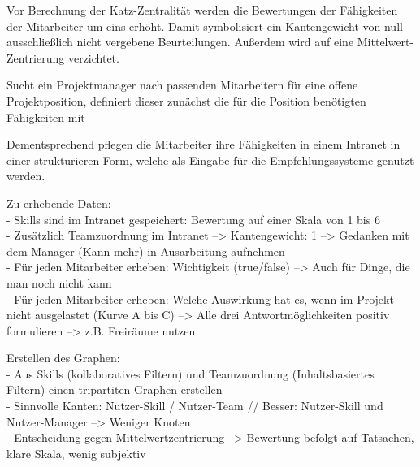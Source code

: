 Vor Berechnung der Katz-Zentralität werden die Bewertungen der Fähigkeiten der Mitarbeiter um eins erhöht. Damit symbolisiert ein Kantengewicht von null ausschließlich nicht vergebene Beurteilungen. Außerdem wird auf eine Mittelwert-Zentrierung verzichtet. 

\newpage
Sucht ein Projektmanager nach passenden Mitarbeitern für eine offene Projektposition, definiert dieser zunächst die für die Position benötigten Fähigkeiten mit

Dementsprechend pflegen die Mitarbeiter ihre Fähigkeiten in einem Intranet in einer strukturieren Form, welche als Eingabe für die Empfehlungssysteme genutzt werden.

Zu erhebende Daten:\\
- Skills sind im Intranet gespeichert: Bewertung auf einer Skala von 1 bis 6\\
- Zusätzlich Teamzuordnung im Intranet --> Kantengewicht: 1 --> Gedanken mit dem Manager (Kann mehr) in Ausarbeitung aufnehmen\\
- Für jeden Mitarbeiter erheben: Wichtigkeit (true/false) --> Auch für Dinge, die man noch nicht kann\\
- Für jeden Mitarbeiter erheben: Welche Auswirkung hat es, wenn im Projekt nicht ausgelastet (Kurve A bis C) --> Alle drei Antwortmöglichkeiten positiv formulieren --> z.B. Freiräume nutzen

Erstellen des Graphen:\\
- Aus Skills (kollaboratives Filtern) und Teamzuordnung (Inhaltsbasiertes Filtern) einen tripartiten Graphen erstellen\\
- Sinnvolle Kanten: Nutzer-Skill / Nutzer-Team // Besser: Nutzer-Skill und Nutzer-Manager --> Weniger Knoten\\
- Entscheidung gegen Mittelwertzentrierung --> Bewertung befolgt auf Tatsachen, klare Skala, wenig subjektiv

